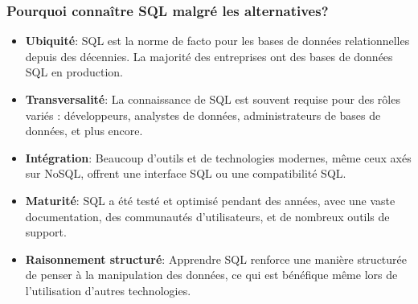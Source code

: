 \begin{frame}
  \frametitle{Pourquoi connaître SQL malgré les alternatives?}

  \begin{itemize}
      \item \textbf{Ubiquité}: SQL est la norme de facto pour les bases de données relationnelles depuis des décennies. La majorité des entreprises ont des bases de données SQL en production.
      \item \textbf{Transversalité}: La connaissance de SQL est souvent requise pour des rôles variés : développeurs, analystes de données, administrateurs de bases de données, et plus encore.
      \item \textbf{Intégration}: Beaucoup d'outils et de technologies modernes, même ceux axés sur NoSQL, offrent une interface SQL ou une compatibilité SQL.
      \item \textbf{Maturité}: SQL a été testé et optimisé pendant des années, avec une vaste documentation, des communautés d'utilisateurs, et de nombreux outils de support.
      \item \textbf{Raisonnement structuré}: Apprendre SQL renforce une manière structurée de penser à la manipulation des données, ce qui est bénéfique même lors de l'utilisation d'autres technologies.
  \end{itemize}
\end{frame}

